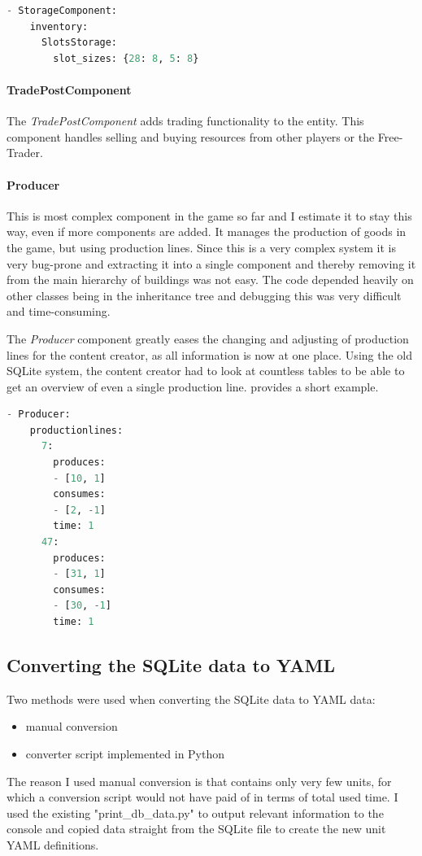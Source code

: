 \begin{lstlisting}[language=python,caption=YAML representation of the StorageComponent using a SlotStorage,
label=storagyaml]
- StorageComponent:
    inventory:
      SlotsStorage:
        slot_sizes: {28: 8, 5: 8}
\end{lstlisting}

\paragraph{TradePostComponent}
The \textit{TradePostComponent} adds trading functionality to the entity. This component handles selling and buying
resources from other players or the Free-Trader.

\paragraph{Producer}
This is most complex component in the game so far and I estimate it to stay this way, even if more components are added.
It manages the production of goods in the game, but using production lines. Since this is a very complex system it is
very bug-prone and extracting it into a single component and thereby removing it from the main hierarchy of buildings
was not easy. The code depended heavily on other classes being in the inheritance tree and debugging this was very
difficult and time-consuming.

The \textit{Producer} component greatly eases the changing and adjusting of production lines for the content creator, as
all information is now at one place. Using the old SQLite system, the content creator had to look at countless tables to
be able to get an overview of even a single production line.  provides a short example.

\begin{lstlisting}[language=python,caption=YAML representation of the Producer with two production lines,
label=produceryaml]
- Producer:
    productionlines:
      7:
        produces:
        - [10, 1]
        consumes:
        - [2, -1]
        time: 1
      47:
        produces:
        - [31, 1]
        consumes:
        - [30, -1]
        time: 1
\end{lstlisting}

\subsection{Converting the SQLite data to YAML}
Two methods were used when converting the SQLite data to YAML data: 
\begin{itemize}
    \item manual conversion
    \item converter script implemented in Python
\end{itemize}
The reason I used manual conversion is that \UH{} contains only very few units, for which a conversion script would not
have paid of in terms of total used time. I used the existing "print\_db\_data.py" to output relevant information to the
console and copied data straight from the SQLite file to create the new unit YAML definitions.

